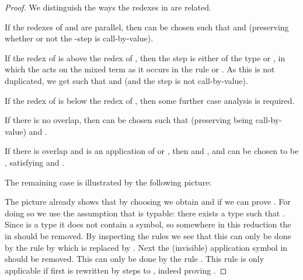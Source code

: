 \documentclass{LMCS}
\begin{document}
\begin{proof}
We distinguish the ways the redexes in  are related.

If the redexes of  and  are parallel,
then  can be chosen such that  and 
(preserving whether or not the -step is call-by-value).

If the redex of  is above the redex of ,
then the  step is either of the type  or
, in which the  acts on the mixed term  as it
occurs in the rule  or . As this  is not
duplicated, we get  such that  and
 (and the step  is not call-by-value).

If the redex of  is below the redex of , then some further case analysis is required.

If there is no overlap, then  can be chosen such that 
 (preserving being call-by-value) and . 

If there is overlap and  is an application of
 or , then  and , and
 can be chosen to be , satisfying
 and .

The remaining case is illustrated by the following picture:

\begin{center}
\end{center}

The picture already shows that by choosing  we
obtain  and   if we can prove 
. For doing so we use the assumption that  is
typable: there exists a type  such that 
. Since  is a type 
it does not contain a  symbol, so somewhere in this
reduction the  in  should be removed. By
inspecting the rules we see that this can only be done by the rule
 by which  is replaced by .
Next the (invisible) application symbol in 
should be removed. This can only be done by the rule .
This rule is only applicable if first  is rewritten by 
steps to , indeed proving .
\end{proof}
\end{document}
